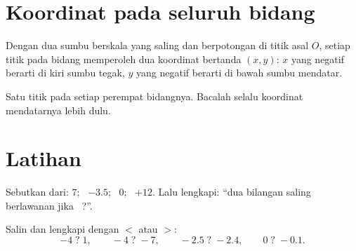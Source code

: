 \section{Koordinat pada seluruh bidang}

\begin{definition}\label{def:g7:negatives:coords}
Dengan dua sumbu berskala yang saling  dan berpotongan di
titik asal $O$, setiap titik pada bidang memperoleh dua koordinat
bertanda $(x, y)$: $x$ yang negatif berarti di kiri sumbu tegak, $y$
yang negatif berarti di bawah sumbu mendatar.
\end{definition}

\begin{omfigure}

{\small Satu titik pada setiap perempat bidangnya. Bacalah selalu
koordinat mendatarnya lebih dulu.}
\end{omfigure}

\section{Latihan}

\begin{exercise}[$\star$]\label{exo:g7:negatives:1}
Sebutkan  dari: $7$; \ $-3.5$; \ $0$; \ $+12$. Lalu lengkapi:
``dua bilangan saling berlawanan jika ~?''.
\end{exercise}

\begin{exercise}[$\star$]\label{exo:g7:negatives:2}
Salin dan lengkapi dengan $<$ atau $>$:
\[
-4 \;?\; 1, \qquad
-4 \;?\; -7, \qquad
-2.5 \;?\; -2.4, \qquad
0 \;?\; -0.1 .
\]
\end{exercise}

